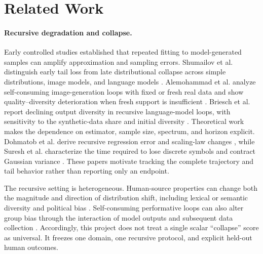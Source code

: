\section{Related Work}
\label{app:related}

\paragraph{Recursive degradation and collapse.}
Early controlled studies established that repeated fitting to model-generated samples can amplify approximation and sampling errors. Shumailov et al. distinguish early tail loss from late distributional collapse across simple distributions, image models, and language models \cite{shumailov2024collapse}. Alemohammad et al. analyze self-consuming image-generation loops with fixed or fresh real data and show quality--diversity deterioration when fresh support is insufficient \cite{alemohammad2024mad}. Briesch et al. report declining output diversity in recursive language-model loops, with sensitivity to the synthetic-data share and initial diversity \cite{briesch2023llmoutput}. Theoretical work makes the dependence on estimator, sample size, spectrum, and horizon explicit. Dohmatob et al. derive recursive regression error and scaling-law changes \cite{dohmatob2024regression,dohmatob2024tails}, while Suresh et al. characterize the time required to lose discrete symbols and contract Gaussian variance \cite{suresh2025rate}. These papers motivate tracking the complete trajectory and tail behavior rather than reporting only an endpoint.

The recursive setting is heterogeneous. Human-source properties can change both the magnitude and direction of distribution shift, including lexical or semantic diversity and political bias \cite{kovac2025recursive}. Self-consuming performative loops can also alter group bias through the interaction of model outputs and subsequent data collection \cite{wang2026scpl}. Accordingly, this project does not treat a single scalar ``collapse'' score as universal. It freezes one domain, one recursive protocol, and explicit held-out human outcomes.

